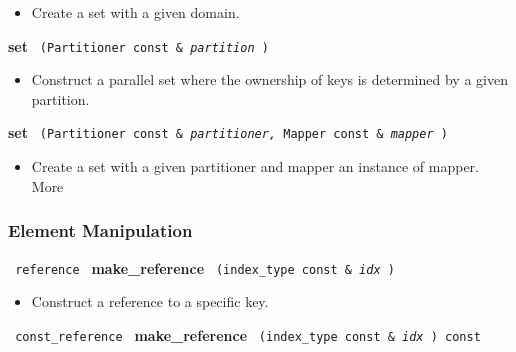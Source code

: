 \begin{itemize}
\item
Create a set with a given domain.
\end{itemize}
 
\noindent
\textbf{set}%
\texttt{%
(Partitioner const \&
\textit{partition}%
)
}

\begin{itemize}
\item
Construct a parallel set where the ownership of keys is determined by a given partition. 
\end{itemize}
 
\noindent
\textbf{set}%
\texttt{%
(Partitioner const \&
\textit{partitioner,}%
Mapper const \&
\textit{mapper}%
)
}

\begin{itemize}
\item
Create a set with a given partitioner and mapper an instance of mapper. More
\end{itemize}

\subsubsection{Element Manipulation}


 

 

\noindent
\texttt{%
reference
}
\textbf{make\_reference}%
\texttt{%
(index\_type const \&
\textit{idx}%
)
}

\begin{itemize}
\item
Construct a reference to a specific key.
\end{itemize}
 
\noindent
\texttt{%
const\_reference
}
\textbf{make\_reference}%
\texttt{%
(index\_type const \&
\textit{idx}%
) const
}

